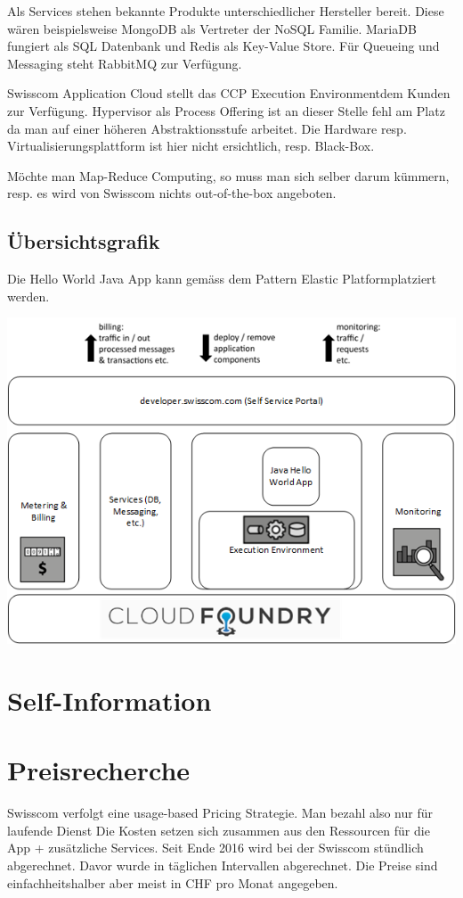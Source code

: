 Als Services stehen bekannte Produkte unterschiedlicher Hersteller bereit. Diese wären beispielsweise MongoDB als Vertreter der NoSQL Familie. MariaDB fungiert als SQL Datenbank und Redis als Key-Value Store. Für Queueing und Messaging steht RabbitMQ zur Verfügung. 

Swisscom Application Cloud stellt das CCP \glqq Execution Environment\grqq dem Kunden zur Verfügung. Hypervisor als Process Offering ist an dieser Stelle fehl am Platz da man auf einer höheren Abstraktionsstufe arbeitet. Die Hardware resp. Virtualisierungsplattform ist hier nicht ersichtlich, resp. Black-Box. 

Möchte man Map-Reduce Computing, so muss man sich selber darum kümmern, resp. es wird von Swisscom nichts out-of-the-box angeboten.

\section{Übersichtsgrafik}
Die Hello World Java App kann gemäss dem Pattern \glqq Elastic Platform\grqq platziert werden.

\includegraphics[scale=0.7]{images/visualisierung}



\chapter{Self-Information}
\chapter{Preisrecherche}
Swisscom verfolgt eine usage-based Pricing Strategie. Man bezahl also nur für laufende Dienst Die Kosten setzen sich zusammen aus den Ressourcen für die App + zusätzliche Services. Seit Ende 2016 wird bei der Swisscom stündlich abgerechnet. Davor wurde in täglichen Intervallen abgerechnet. Die Preise sind einfachheitshalber aber meist in CHF pro Monat angegeben. 

